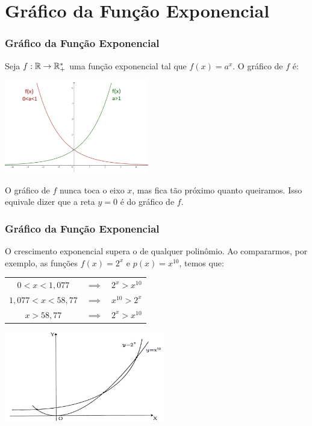 \documentclass[brazil, notheorems, 10pt]{beamer}
\begin{document}
\section{Gráfico da Função Exponencial}
\begin{frame}
\frametitle{Gráfico da Função Exponencial} %

\begin{Exem}
Seja $f: \mathbb{R} \to \mathbb{R}_+^\ast$ uma função exponencial tal que $f(x) =
a^x$. O gráfico de $f$ é:
\begin{center}
\includegraphics[width=6.3cm]{figures/grafexp.jpg}
\end{center}
O gráfico de $f$ nunca toca o eixo $x$, mas fica tão próximo quanto
queiramos. Isso equivale dizer que a reta $y=0$ é  do
gráfico de $f$.
\end{Exem}

\end{frame}




\begin{frame}
\frametitle{Gráfico da Função Exponencial} %

\begin{Exem}
O crescimento exponencial supera o de qualquer polinômio. Ao
compararmos, por exemplo, as funções $f(x) = 2^x$ e
$p(x)=x^{10}$, temos que:\\
\begin{tabular}{ccc}
$0<x<1{,}077$ & $\implies$ & $2^x > x^{10}$\\
$1{,}077 < x < 58{,}77$ & $\implies$ & $x^{10} > 2^x$\\
$x>58{,}77$ & $\implies $& $2^x > x^{10}$
\end{tabular}
\begin{center}
\includegraphics[width=7cm]{figures/polXexp.jpg}
\end{center}
\end{Exem}

\end{frame}
\end{document}
